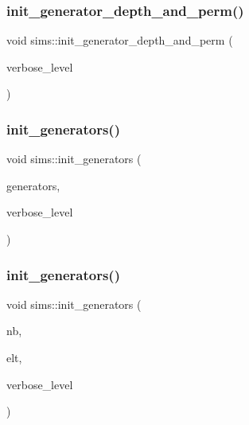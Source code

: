 \mbox{\label{classsims_af8c21505bf172665ba503cf3138f38cd}} 
\subsubsection{\texorpdfstring{init\+\_\+generator\+\_\+depth\+\_\+and\+\_\+perm()}{init\_generator\_depth\_and\_perm()}}
{\footnotesize\ttfamily void sims\+::init\+\_\+generator\+\_\+depth\+\_\+and\+\_\+perm (\begin{DoxyParamCaption}\item[{\mbox{\hyperlink{galois_8h_a09fddde158a3a20bd2dcadb609de11dc}{I\+NT}}}]{verbose\+\_\+level }\end{DoxyParamCaption})}

\mbox{\label{classsims_aa2a7908389727bdfa05d034e8d53a818}} 
\subsubsection{\texorpdfstring{init\+\_\+generators()}{init\_generators()}\hspace{0.1cm}{\footnotesize\ttfamily [1/2]}}
{\footnotesize\ttfamily void sims\+::init\+\_\+generators (\begin{DoxyParamCaption}\item[{\mbox{\hyperlink{classvector__ge}{vector\+\_\+ge}} \&}]{generators,  }\item[{\mbox{\hyperlink{galois_8h_a09fddde158a3a20bd2dcadb609de11dc}{I\+NT}}}]{verbose\+\_\+level }\end{DoxyParamCaption})}

\mbox{\label{classsims_a2917ebf2dc37af6cfa39310549994d98}} 
\subsubsection{\texorpdfstring{init\+\_\+generators()}{init\_generators()}\hspace{0.1cm}{\footnotesize\ttfamily [2/2]}}
{\footnotesize\ttfamily void sims\+::init\+\_\+generators (\begin{DoxyParamCaption}\item[{\mbox{\hyperlink{galois_8h_a09fddde158a3a20bd2dcadb609de11dc}{I\+NT}}}]{nb,  }\item[{\mbox{\hyperlink{galois_8h_a09fddde158a3a20bd2dcadb609de11dc}{I\+NT}} $\ast$}]{elt,  }\item[{\mbox{\hyperlink{galois_8h_a09fddde158a3a20bd2dcadb609de11dc}{I\+NT}}}]{verbose\+\_\+level }\end{DoxyParamCaption})}

